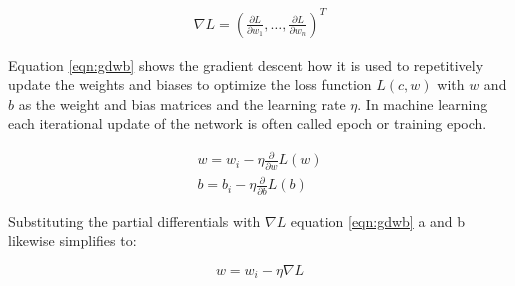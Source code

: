 \begin{eqnarray}
  \nabla L = \left(\frac{\partial L}{\partial w_1}, \ldots ,
  \frac{\partial L}{\partial w_n}\right)^T
 \label{eqn:gd}
\end{eqnarray}

Equation \ref{eqn:gdwb} shows the gradient descent how it is used to repetitively update
the weights and biases to optimize the loss function $L(c,w)$ with $w$ and $b$ as the
weight and bias matrices and the learning rate $\eta$. In machine learning each
iterational update of the network is often called epoch or training epoch.

\begin{subequations}
 \begin{align}
  w = w_i - \eta \frac{\partial}{\partial w}L(w) \\
  b = b_i - \eta \frac{\partial}{\partial b}L(b) 
 \end{align}
 \label{eqn:gdwb}
\end{subequations}

Substituting the partial differentials with $\nabla L$ equation \ref{eqn:gdwb} a and b likewise simplifies to:

\begin{equation}
 w = w_i - \eta \nabla L
 \label{eqn:simplegd} 
\end{equation}

